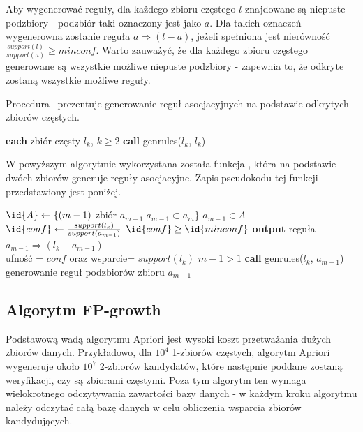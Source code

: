 Aby wygenerować reguły, dla każdego zbioru częstego $l$ znajdowane są niepuste podzbiory - podzbiór taki oznaczony jest jako $a$. Dla takich oznaczeń wygenerowna zostanie reguła $a \Rightarrow (l-a)$, jeżeli spełniona jest nierówność $\frac{support(l)}{support(a)} \geq minconf$. Warto zauważyć, że dla każdego zbioru częstego generowane są wszystkie możliwe niepuste podzbiory - zapewnia to, że odkryte zostaną wszystkie możliwe reguły.

Procedura~ prezentuje generowanie reguł asocjacyjnych na podstawie odkrytych zbiorów częstych.

\begin{codebox}
		\li \For \textbf{each} zbiór częsty $l_k$, $k \geq 2$ 
		\li \Do
			\textbf{call} genrules($l_k$, $l_k$)
			\End
		\End
\end{codebox}

W powyższym algorytmie wykorzystana została funkcja , która na podstawie dwóch zbiorów generuje reguły asocjacyjne. Zapis pseudokodu tej funkcji przedstawiony jest poniżej.

\begin{codebox}
		\li $\id{A} \gets \lbrace (m-1)$-zbiór $a_{m-1} | a_{m-1} \subset a_m \rbrace$
		\li \For $a_{m-1} \in A$
			\li \Do
			$\id{conf} \gets \frac{support(l_k)}{support(a_{m-1})}$
			\li \If $\id{conf} \geq \id{minconf}$
				\li \Then
						\textbf{output} reguła $a_{m-1} \Rightarrow (l_k - a_{m-1})$ \\ ufność = $conf$ oraz wsparcie= $support(l_k)$
						\li \If $m-1 > 1$ 
							\li \Then
							\textbf{call} genrules($l_k$, $a_{m-1}$) \\ generowanie reguł podzbiorów zbioru $a_{m-1}$
						\End
				\End
			\End
		\End
\end{codebox}

\subsection{Algorytm FP-growth}

Podstawową wadą algorytmu Apriori jest wysoki koszt przetważania dużych zbiorów danych. Przykładowo, dla $10^4$ 1-zbiorów częstych, algorytm Apriori wygeneruje około $10^7$ 2-zbiorów kandydatów, które następnie poddane zostaną weryfikacji, czy są zbiorami częstymi. Poza tym algorytm ten wymaga wielokrotnego odczytywania zawartości bazy danych - w każdym kroku algorytmu należy odczytać całą bazę danych w celu obliczenia wsparcia zbiorów kandydujących.

